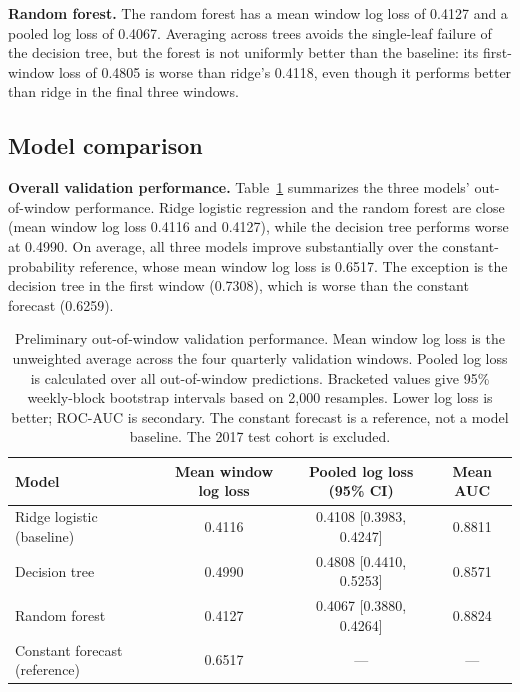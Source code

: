 \documentclass{article}
\begin{document}
\textbf{Random forest.}
The random forest has a mean window log loss of 0.4127 and a pooled
log loss of 0.4067. Averaging across trees avoids the single-leaf
failure of the decision tree, but the forest is not uniformly better
than the baseline: its first-window loss of 0.4805 is worse than
ridge's 0.4118, even though it performs better than ridge in the
final three windows.

\subsection{Model comparison}

\textbf{Overall validation performance.}
Table~\ref{tab:validation-results} summarizes the three models'
out-of-window performance. Ridge logistic regression and the random
forest are close (mean window log loss 0.4116 and 0.4127), while the
decision tree performs worse at 0.4990. On average, all three models
improve substantially over the constant-probability reference, whose
mean window log loss is 0.6517. The exception is the decision tree in
the first window (0.7308), which is worse than the constant forecast
(0.6259).

\begin{table}[H]
    \caption{Preliminary out-of-window validation performance.
    Mean window log loss is the unweighted average across the four
    quarterly validation windows. Pooled log loss is calculated
    over all out-of-window predictions. Bracketed values give
    95\% weekly-block bootstrap intervals based on 2,000 resamples.
    Lower log loss is better; ROC-AUC is secondary. The constant
    forecast is a reference, not a model baseline. The 2017 test
    cohort is excluded.}
    \label{tab:validation-results}
    \centering
    \small
    \setlength{\tabcolsep}{4pt}
    \begin{tabular}{lccc}
        \toprule
        Model & Mean window log loss &
        Pooled log loss (95\% CI) & Mean AUC \\
        \midrule
        Ridge logistic (baseline) & 0.4116 & 0.4108 [0.3983, 0.4247] & 0.8811 \\
        Decision tree & 0.4990 & 0.4808 [0.4410, 0.5253] & 0.8571 \\
        Random forest & 0.4127 & 0.4067 [0.3880, 0.4264] & 0.8824 \\
        Constant forecast (reference) & 0.6517 & --- & --- \\
        \bottomrule
    \end{tabular}
\end{table}
\end{document}
